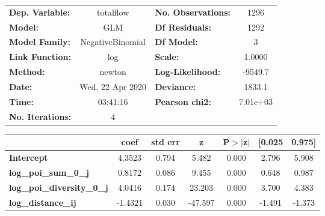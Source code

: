 \begin{center}
\begin{tabular}{lclc}
\toprule
\textbf{Dep. Variable:}            &    totalflow     & \textbf{  No. Observations:  } &     1296    \\
\textbf{Model:}                    &       GLM        & \textbf{  Df Residuals:      } &     1292    \\
\textbf{Model Family:}             & NegativeBinomial & \textbf{  Df Model:          } &        3    \\
\textbf{Link Function:}            &       log        & \textbf{  Scale:             } &    1.0000   \\
\textbf{Method:}                   &      newton      & \textbf{  Log-Likelihood:    } &   -9549.7   \\
\textbf{Date:}                     & Wed, 22 Apr 2020 & \textbf{  Deviance:          } &    1833.1   \\
\textbf{Time:}                     &     03:41:16     & \textbf{  Pearson chi2:      } &  7.01e+03   \\
\textbf{No. Iterations:}           &        4         & \textbf{                     } &             \\
\bottomrule
\end{tabular}
\begin{tabular}{lcccccc}
                                   & \textbf{coef} & \textbf{std err} & \textbf{z} & \textbf{P$> |$z$|$} & \textbf{[0.025} & \textbf{0.975]}  \\
\midrule
\textbf{Intercept}                 &       4.3523  &        0.794     &     5.482  &         0.000        &        2.796    &        5.908     \\
\textbf{log\_poi\_sum\_0\_j}       &       0.8172  &        0.086     &     9.455  &         0.000        &        0.648    &        0.987     \\
\textbf{log\_poi\_diversity\_0\_j} &       4.0416  &        0.174     &    23.203  &         0.000        &        3.700    &        4.383     \\
\textbf{log\_distance\_ij}         &      -1.4321  &        0.030     &   -47.597  &         0.000        &       -1.491    &       -1.373     \\
\bottomrule
\end{tabular}
\end{center}